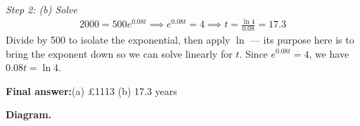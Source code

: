 \documentclass[11pt]{article}
\begin{document}
\textit{Step 2: (b) Solve}
\[\begin{gathered}
2000 = 500e^{0.08t} \implies e^{0.08t} = 4 \implies t = \frac{\ln 4}{0.08} = 17.3
\end{gathered}\]
Divide by 500 to isolate the exponential, then apply \( \ln \) --- its purpose here is to bring the exponent down so we can solve linearly for \( t \). Since \( e^{0.08t} = 4 \), we have \( 0.08t = \ln 4 \).

\begin{answerbox}
\textbf{Final answer:}\quad (a) \pounds 1113 (b) 17.3 years
\end{answerbox}
\textbf{Diagram.}

\begin{center}
\end{center}
\end{document}
